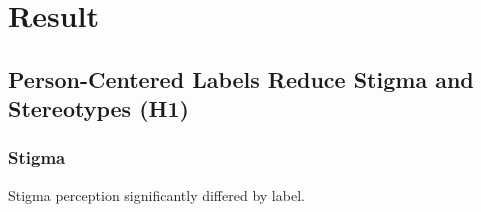 \documentclass[
  man,
  floatsintext,
  longtable,
  nolmodern,
  notxfonts,
  notimes,
  colorlinks=true,linkcolor=blue,citecolor=blue,urlcolor=blue]{apa7}
\begin{document}
\section{Result}\label{result}

\subsection{Person-Centered Labels Reduce Stigma and Stereotypes
(H1)}\label{person-centered-labels-reduce-stigma-and-stereotypes-h1}

\subsubsection{Stigma}\label{stigma}

Stigma perception significantly differed by label.

\begin{figure}

\caption{\label{fig-stigma-by-label}}


\end{figure}%
\end{document}
